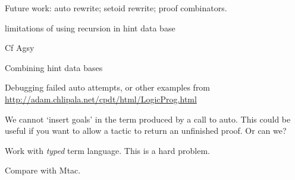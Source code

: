 \documentclass[preprint]{sigplanconf}
\begin{document}

Future work: auto rewrite; setoid rewrite; proof combinators.

limitations of using recursion in hint data base

Cf Agsy



Combining hint data bases

Debugging failed auto attempts, or other examples from
\url{http://adam.chlipala.net/cpdt/html/LogicProg.html}

We cannot `insert goals' in the term produced by a call to auto. This
could be useful if you want to allow a tactic to return an unfinished
proof. Or can we?

Work with \emph{typed} term language. This is a hard problem.

Compare with Mtac.



\end{document}
